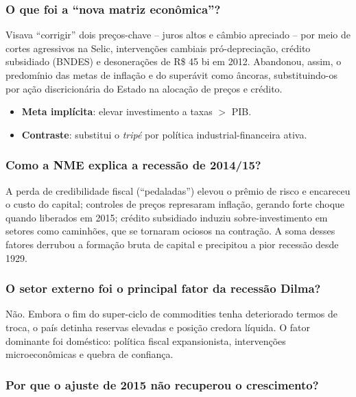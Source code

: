 \documentclass[a4paper,12pt]{article}[abntex2]
\begin{document}
\subsubsection{\textbf{O que foi a “nova matriz econômica”?}}

Visava “corrigir” dois preços-chave – juros altos e câmbio apreciado – por meio de cortes agressivos na Selic, intervenções cambiais pró-depreciação, crédito subsidiado (BNDES) e desonerações de R\$ 45 bi em 2012. Abandonou, assim, o predomínio das metas de inflação e do superávit como âncoras, substituindo-os por ação discricionária do Estado na alocação de preços e crédito. 

\begin{itemize}
  \item \textbf{Meta implícita}: elevar investimento a taxas \(>\) PIB. 
  \item \textbf{Contraste}: substitui o \emph{tripé} por política industrial-financeira ativa.
\end{itemize}

\subsubsection{\textbf{Como a NME explica a recessão de 2014/15?}}

A perda de credibilidade fiscal (“pedaladas”) elevou o prêmio de risco e encareceu o custo do capital; controles de preços represaram inflação, gerando forte choque quando liberados em 2015; crédito subsidiado induziu sobre-investimento em setores como caminhões, que se tornaram ociosos na contração. A soma desses fatores derrubou a formação bruta de capital e precipitou a pior recessão desde 1929. 

\subsubsection{\textbf{O setor externo foi o principal fator da recessão Dilma?}}

Não. Embora o fim do super-ciclo de commodities tenha deteriorado termos de troca, o país detinha reservas elevadas e posição credora líquida. O fator dominante foi doméstico: política fiscal expansionista, intervenções microeconômicas e quebra de confiança. 

\subsubsection{\textbf{Por que o ajuste de 2015 não recuperou o crescimento?}}
\end{document}
